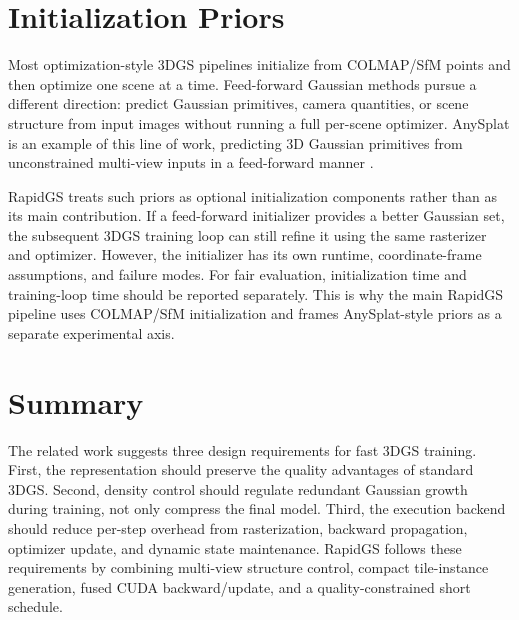 \section{Initialization Priors}

Most optimization-style 3DGS pipelines initialize from COLMAP/SfM points and then optimize one scene at a time. Feed-forward Gaussian methods pursue a different direction: predict Gaussian primitives, camera quantities, or scene structure from input images without running a full per-scene optimizer. AnySplat is an example of this line of work, predicting 3D Gaussian primitives from unconstrained multi-view inputs in a feed-forward manner \cite{Jiang2025AnySplat}.

RapidGS treats such priors as optional initialization components rather than as its main contribution. If a feed-forward initializer provides a better Gaussian set, the subsequent 3DGS training loop can still refine it using the same rasterizer and optimizer. However, the initializer has its own runtime, coordinate-frame assumptions, and failure modes. For fair evaluation, initialization time and training-loop time should be reported separately. This is why the main RapidGS pipeline uses COLMAP/SfM initialization and frames AnySplat-style priors as a separate experimental axis.

\section{Summary}

The related work suggests three design requirements for fast 3DGS training. First, the representation should preserve the quality advantages of standard 3DGS. Second, density control should regulate redundant Gaussian growth during training, not only compress the final model. Third, the execution backend should reduce per-step overhead from rasterization, backward propagation, optimizer update, and dynamic state maintenance. RapidGS follows these requirements by combining multi-view structure control, compact tile-instance generation, fused CUDA backward/update, and a quality-constrained short schedule.

